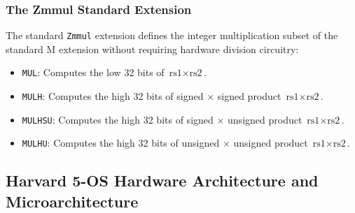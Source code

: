 \subsubsection{The Zmmul Standard Extension}
The standard \texttt{Zmmul} extension defines the integer multiplication subset of the standard M extension without requiring hardware division circuitry:
\begin{itemize}
    \item \texttt{MUL}: Computes the low 32 bits of $\text{rs1} \times \text{rs2}$.
    \item \texttt{MULH}: Computes the high 32 bits of signed $\times$ signed product $\text{rs1} \times \text{rs2}$.
    \item \texttt{MULHSU}: Computes the high 32 bits of signed $\times$ unsigned product $\text{rs1} \times \text{rs2}$.
    \item \texttt{MULHU}: Computes the high 32 bits of unsigned $\times$ unsigned product $\text{rs1} \times \text{rs2}$.
\end{itemize}


\subsection{Harvard 5-OS Hardware Architecture and Microarchitecture}\label{riscvArch}

